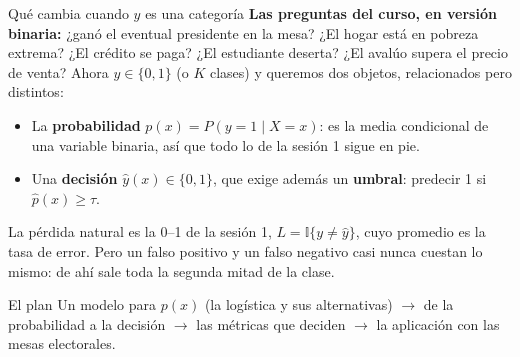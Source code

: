 \documentclass{beamer}
\newcommand{\1}{\mathbb{I}}
\begin{document}
\begin{frame}{Qué cambia cuando $y$ es una categoría}
\small
\textbf{Las preguntas del curso, en versión binaria:} ¿ganó el eventual presidente en la mesa? ¿El hogar está en pobreza extrema? ¿El crédito se paga? ¿El estudiante deserta? ¿El avalúo supera el precio de venta?
\pause
\vspace{0.15cm}
Ahora $y \in \{0, 1\}$ (o $K$ clases) y queremos dos objetos, relacionados pero distintos:
\begin{itemize}\itemsep4pt
  \item La \textbf{probabilidad} $p(x) = P(y = 1 \mid X = x)$: es la media condicional de una variable binaria, así que todo lo de la sesión 1 sigue en pie.
  \item Una \textbf{decisión} $\hat{y}(x) \in \{0, 1\}$, que exige además un \textbf{umbral}: predecir 1 si $\hat{p}(x) \geq \tau$.
\end{itemize}
\pause
\vspace{0.15cm}
La pérdida natural es la 0--1 de la sesión 1, $L = \1\{y \neq \hat{y}\}$, cuyo promedio es la tasa de error. Pero un falso positivo y un falso negativo casi nunca cuestan lo mismo: de ahí sale toda la segunda mitad de la clase.
\pause
\vspace{0.15cm}
\begin{block}{El plan}
Un modelo para $p(x)$ (la logística y sus alternativas) $\rightarrow$ de la probabilidad a la decisión $\rightarrow$ las métricas que deciden $\rightarrow$ la aplicación con las mesas electorales.
\end{block}
\end{frame}
\end{document}

